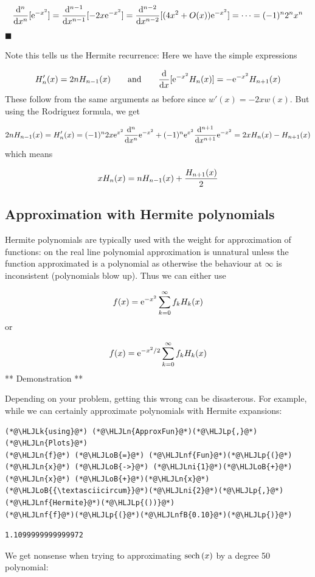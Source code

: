\documentclass[12pt,a4paper]{article}
\newcommand{\HLJLk}[1]{\textcolor[RGB]{148,91,176}{\textbf{#1}}}
\newcommand{\HLJLn}[1]{#1}
\newcommand{\HLJLnf}[1]{\textcolor[RGB]{66,102,213}{#1}}
\newcommand{\HLJLnfB}[1]{\textcolor[RGB]{59,151,46}{#1}}
\newcommand{\HLJLni}[1]{\textcolor[RGB]{59,151,46}{#1}}
\newcommand{\HLJLoB}[1]{\textcolor[RGB]{102,102,102}{\textbf{#1}}}
\newcommand{\HLJLp}[1]{#1}
\def\qqand{\qquad\hbox{and}\qquad}
\def\D{ {\rm d} }
\def\E{ {\rm e} }
\def\sech{ {\rm sech}\, }
\def\dx{\D x}
\begin{document}
\[
 {\D^n \over \dx^n}[\E^{-x^2}] =  {\D^{n-1} \over \dx^{n-1}}[-2x \E^{-x^2}] = {\D^{n-2} \over \dx^{n-2}}[(4x^2 + O(x)) \E^{-x^2}] = \cdots = (-1)^n 2^n x^n
\]
\ensuremath{\blacksquare}

Note this tells us the Hermite recurrence: Here we have the simple expressions

\[
H_n'(x) = 2n H_{n-1}(x) \qqand {\D \over \dx}[\E^{-x^2} H_n(x)] = -\E^{-x^2} H_{n+1}(x)
\]
These follow from the same arguments as before since $w'(x) = -2x w(x)$. But using the Rodriguez formula, we get

\[
2n H_{n-1}(x)  = H_{n}'(x) = (-1)^{n} 2 x  \E^{x^2}  {\D^{n} \over \dx^{n}} \E^{-x^2}  + (-1)^n \E^{x^2}  {\D^{n+1} \over \dx^{n+1}} \E^{-x^2} = 2x H_n(x) - H_{n+1}(x)
\]
which means

\[
x H_n(x) = nH_{n-1}(x) +{H_{n+1}(x) \over 2}
\]
\subsection{Approximation with Hermite polynomials}
Hermite polynomials are typically used with the weight for approximation of functions: on the real line polynomial approximation is unnatural unless  the function approximated is a polynomial as otherwise the behaviour at \ensuremath{\infty} is inconsistent (polynomials blow up).  Thus we can either use

\[
f(x) = \E^{-x^2}\sum_{k=0}^\infty f_k H_k(x)
\]
or

\[
f(x) = \E^{-x^2/2}\sum_{k=0}^\infty f_k H_k(x)
\]
** Demonstration **

Depending on your problem, getting this wrong can be disasterous. For example, while we can certainly approximate polynomials with Hermite expansions:


\begin{lstlisting}
(*@\HLJLk{using}@*) (*@\HLJLn{ApproxFun}@*)(*@\HLJLp{,}@*) (*@\HLJLn{Plots}@*)
(*@\HLJLn{f}@*) (*@\HLJLoB{=}@*) (*@\HLJLnf{Fun}@*)(*@\HLJLp{(}@*)(*@\HLJLn{x}@*) (*@\HLJLoB{->}@*) (*@\HLJLni{1}@*)(*@\HLJLoB{+}@*)(*@\HLJLn{x}@*) (*@\HLJLoB{+}@*)(*@\HLJLn{x}@*)(*@\HLJLoB{{\textasciicircum}}@*)(*@\HLJLni{2}@*)(*@\HLJLp{,}@*) (*@\HLJLnf{Hermite}@*)(*@\HLJLp{())}@*)
(*@\HLJLnf{f}@*)(*@\HLJLp{(}@*)(*@\HLJLnfB{0.10}@*)(*@\HLJLp{)}@*)
\end{lstlisting}

\begin{lstlisting}
1.1099999999999972
\end{lstlisting}


We get nonsense when trying to approximating $\sech(x)$ by a degree 50 polynomial:
\end{document}
